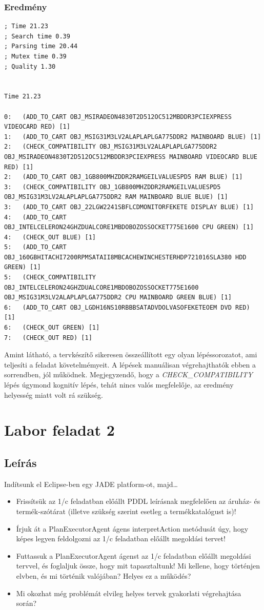 \subsubsection{Eredmény}
\begin{lstlisting}[frame=single,float=!ht]	
; Time 21.23
; Search time 0.39
; Parsing time 20.44
; Mutex time 0.39
; Quality 1.30


Time 21.23

0:   (ADD_TO_CART OBJ_MSIRADEON4830T2D512OC512MBDDR3PCIEXPRESS VIDEOCARD RED) [1]
1:   (ADD_TO_CART OBJ_MSIG31M3LV2ALAPLAPLGA775DDR2 MAINBOARD BLUE) [1]
2:   (CHECK_COMPATIBILITY OBJ_MSIG31M3LV2ALAPLAPLGA775DDR2 OBJ_MSIRADEON4830T2D512OC512MBDDR3PCIEXPRESS MAINBOARD VIDEOCARD BLUE RED) [1]
2:   (ADD_TO_CART OBJ_1GB800MHZDDR2RAMGEILVALUESPD5 RAM BLUE) [1]
3:   (CHECK_COMPATIBILITY OBJ_1GB800MHZDDR2RAMGEILVALUESPD5 OBJ_MSIG31M3LV2ALAPLAPLGA775DDR2 RAM MAINBOARD BLUE BLUE) [1]
3:   (ADD_TO_CART OBJ_22LGW2241SBFLCDMONITORFEKETE DISPLAY BLUE) [1]
4:   (ADD_TO_CART OBJ_INTELCELERON24GHZDUALCORE1MBDOBOZOSSOCKET775E1600 CPU GREEN) [1]
4:   (CHECK_OUT BLUE) [1]
5:   (ADD_TO_CART OBJ_160GBHITACHI7200RPMSATAII8MBCACHEWINCHESTERHDP721016SLA380 HDD GREEN) [1]
5:   (CHECK_COMPATIBILITY OBJ_INTELCELERON24GHZDUALCORE1MBDOBOZOSSOCKET775E1600 OBJ_MSIG31M3LV2ALAPLAPLGA775DDR2 CPU MAINBOARD GREEN BLUE) [1]
6:   (ADD_TO_CART OBJ_LGDH16NS10RBBBSATADVDOLVASOFEKETEOEM DVD RED) [1]
6:   (CHECK_OUT GREEN) [1]
7:   (CHECK_OUT RED) [1]
\end{lstlisting}
Amint látható, a tervkészítő sikeresen összeállított egy olyan lépéssorozatot, ami teljesíti a feladat követelmémyeit. A lépések manuálisan végrehajthatók ebben a sorrendben, jól működnek. Megjegyzendő, hogy a \emph{CHECK\_COMPATIBILITY} lépés úgymond kognitív lépés, tehát nincs valós megfelelője, az eredmény helyesség miatt volt rá szükség.

\section{Labor feladat 2}
\subsection{Leírás}
Indítsunk el Eclipse-ben egy JADE platform-ot, majd… 
\begin{itemize}
\item Frissítsük az 1/c feladatban előállt PDDL leírásnak megfelelően az áruház- és termék-szótárat (illetve szükség szerint esetleg a termékkatalógust is)! 
\item Írjuk át a PlanExecutorAgent ágens interpretAction metódusát úgy, hogy képes legyen feldolgozni az 1/c feladatban előállt megoldási tervet! 
\item Futtassuk a PlanExecutorAgent ágenst az 1/c feladatban előállt megoldási tervvel, és foglaljuk össze, hogy mit tapasztaltunk! Mi kellene, hogy történjen elvben, és mi történik valójában? Helyes ez a működés? 
\item Mi okozhat még problémát elvileg helyes tervek gyakorlati végrehajtása során?
\end{itemize}
